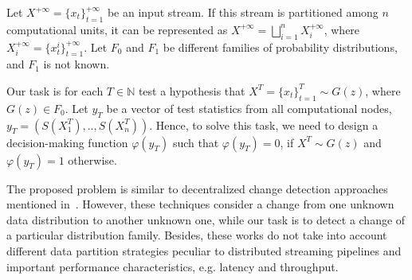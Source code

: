 \label {fs-short-model}

Let $X^{+\infty}=\{x_t\}_{t=1}^{+\infty}$ be an input stream. If this stream is partitioned among $n$ computational units, it can be represented as $X^{+\infty}=\bigsqcup_{i=1}^n X_i^{+\infty}$, where $X_i^{+\infty}=\{x_t^i\}_{t=1}^{+\infty}$. Let $F_0$ and $F_1$ be different families of probability distributions, and $F_1$ is not known. 

Our task is for each $T\in \mathbb{N}$ test a hypothesis that $X^T=\{x_t\}_{t=1}^{T} \sim G(z)$, where $G(z) \in F_0$. Let $y_T$ be a vector of test statistics from all computational nodes,  $y_T = (S(X_1^T),..,S(X_n^T))$. Hence, to solve this task, we need to design a decision-making function $\varphi(y_T)$ such that $\varphi(y_T) = 0$, if $X^T \sim G(z)$  and $\varphi(y_T) = 1$ otherwise.

The proposed problem is similar to decentralized change detection approaches mentioned in~\cite{tartakovsky2008asymptotically, tran2014change}. However, these techniques consider a change from one unknown data distribution to another unknown one, while our task is to detect a change of a particular distribution family. Besides, these works do not take into account different data partition strategies peculiar to distributed streaming pipelines and important performance characteristics, e.g. latency and throughput.